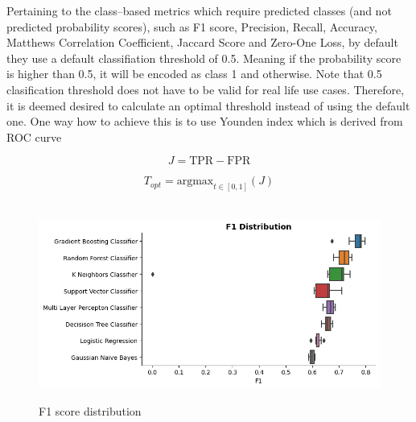 Pertaining to the class--based metrics which require predicted classes (and not predicted probability scores), such as F1 score, Precision, Recall, Accuracy, Matthews Correlation Coefficient, Jaccard Score and Zero-One Loss, by default they use a default classifiation threshold of 0.5.
Meaning if the probability score is higher than 0.5, it will be encoded as class 1 and otherwise. 
Note that 0.5 clasification threshold does not have to be valid for real life use cases. Therefore, it is deemed desired to calculate an optimal threshold instead of using the default one.
One way how to achieve this is to use Younden index which is derived from ROC curve 

\begin{equation}\label{eq}
J = \text{TPR} - \text{FPR}
\end{equation}


\begin{equation}\label{eq}
    T_{opt} = \text{argmax}_{t \in [0, 1]}(J)
\end{equation}

\begin{figure}[H]
    \centering
    \caption{F1 score distribution}\vspace{0.5em}
    \label{fig:f1dist}\
    \includegraphics[width=140mm]{Figures/F1_Distribution.jpg}
    \vspace{-1em}
\end{figure}

